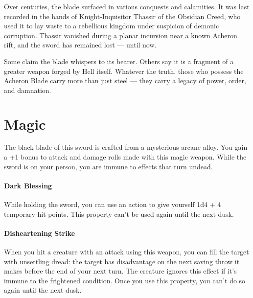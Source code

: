 Over centuries, the blade surfaced in various conquests and calamities. It was last recorded in the hands of Knight-Inquisitor Thassir of the Obsidian Creed, who used it to lay waste to a rebellious kingdom under suspicion of demonic corruption. Thassir vanished during a planar incursion near a known Acheron rift, and the sword has remained lost — until now.

Some claim the blade whispers to its bearer. Others say it is a fragment of a greater weapon forged by Hell itself. Whatever the truth, those who possess the Acheron Blade carry more than just steel — they carry a legacy of power, order, and damnation.

\section*{Magic}
The black blade of this sword is crafted from a mysterious arcane alloy. You gain a +1 bonus to attack and damage rolls made with this magic weapon. While the sword is on your person, you are immune to effects that turn undead.

\paragraph*{Dark Blessing} While holding the sword, you can use an action to give yourself 1d4 + 4 temporary hit points. This property can't be used again until the next dusk.

\paragraph*{Disheartening Strike} When you hit a creature with an attack using this weapon, you can fill the target with unsettling dread: the target has disadvantage on the next saving throw it makes before the end of your next turn. The creature ignores this effect if it's immune to the frightened condition. Once you use this property, you can't do so again until the next dusk.